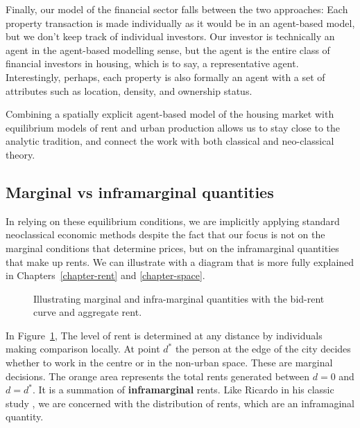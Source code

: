 Finally, our model of the financial sector falls between the two approaches: Each property transaction is made individually as it would be in an agent-based model, but we don't keep track of individual investors. Our investor is technically an agent in the agent-based modelling sense, but the agent is the entire class of financial investors in housing, which is to say, a representative agent. Interestingly, perhaps, each property is also formally an agent with a set of attributes such as location, density, and ownership status. 


Combining a spatially explicit agent-based model of the housing market with equilibrium  models of rent and urban production allows us to stay close to the analytic tradition, and connect the work with both classical and neo-classical theory. %



\subsection{Marginal vs inframarginal quantities}
In relying on these equilibrium conditions, we are implicitly applying standard neoclassical economic methods despite the fact that our focus is not on the \gls{marginal} conditions that determine prices, but on the \gls{inframarginal} quantities that make up rents. We can illustrate with a diagram that is more fully explained in Chapters~\ref{chapter-rent} and \ref{chapter-space}. 

\vspace{.3cm}

\begin{figure}[h!t!]
\centering

\caption{Illustrating marginal and infra-marginal quantities with the bid-rent curve and aggregate rent.}
\label{fig-land-rent-as-inframarginal}
\end{figure}

In Figure~\ref{fig-land-rent-as-inframarginal}, The level of rent is determined at any distance by individuals making comparison locally. At point $d^*$ the person at the edge of the city decides whether to work in the centre or in the non-urban space. These are \gls{marginal} decisions. The orange area represents the total rents generated between $d=0$ and $d=d^*$. It is a summation of \textbf{\gls{inframarginal}} rents. Like Ricardo in his classic study \cite{ricardoEssayInfluenceLow1815}, we are concerned with the distribution of rents, which are an inframaginal quantity.


